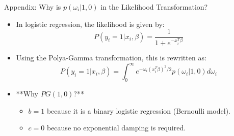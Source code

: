 \documentclass{beamer}
\begin{document}
	\begin{frame}{Appendix: Why is $p(\omega_i | 1, 0)$ in the Likelihood Transformation?}
		\begin{itemize}
			\item In logistic regression, the likelihood is given by:
			\begin{equation}
				P(y_i = 1 | x_i, \beta) = \frac{1}{1 + e^{-x_i^T \beta}}
			\end{equation}
			\item Using the Polya-Gamma transformation, this is rewritten as:
			\begin{equation}
				P(y_i = 1 | x_i, \beta) = \int_0^\infty e^{-\omega_i (x_i^T \beta)^2 / 2} p(\omega_i | 1, 0) d\omega_i
			\end{equation}
			\item **Why $PG(1,0)$?**
			\begin{itemize}
				\item $b = 1$ because it is a binary logistic regression (Bernoulli model).
				\item $c = 0$ because no exponential damping is required.
			\end{itemize}
		\end{itemize}
	\end{frame}
\end{document}
